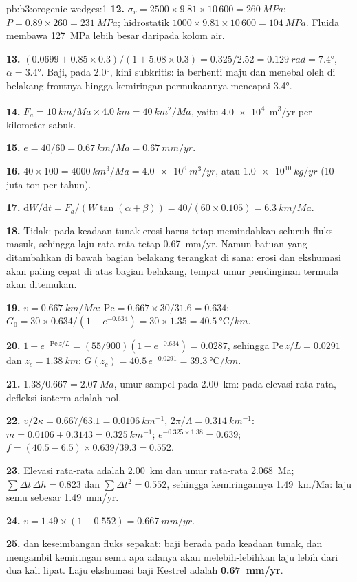 \begin{solution}{pb:b3:orogenic-wedges:1}
\textbf{12.} $\sigma_v = 2500\times9.81\times10\,600 = \qty{260}{MPa}$; $P =
0.89\times260 = \qty{231}{MPa}$; hidrostatik $1000\times9.81\times10\,600 =
\qty{104}{MPa}$. Fluida membawa \qty{127}{MPa} lebih besar daripada
kolom air.

\textbf{13.} $(0.0699 + 0.85\times0.3)/(1 + 5.08\times0.3) = 0.325/2.52 =
\qty{0.129}{rad} = \ang{7.4}$, $\alpha = \ang{3.4}$. Baji, pada \ang{2.0},
kini subkritis: ia berhenti maju dan menebal oleh 
di belakang frontnya hingga kemiringan permukaannya mencapai \ang{3.4}.

\textbf{14.} $F_a = \qty{10}{km/Ma}\times\qty{4.0}{km} = \qty{40}{km^2/Ma}$,
yaitu \qty{4.0e4}{m^3/yr} per kilometer sabuk.

\textbf{15.} $\bar e = 40/60 = \qty{0.67}{km/Ma} = \qty{0.67}{mm/yr}$.

\textbf{16.} $40\times100 = \qty{4000}{km^3/Ma} = \qty{4.0e6}{m^3/yr}$, atau
$\qty{1.0e10}{kg/yr}$ (10 juta ton per tahun).

\textbf{17.} $\mathrm dW/\mathrm dt = F_a/(W\tan(\alpha + \beta)) =
40/(60\times0.105) = \qty{6.3}{km/Ma}$.

\textbf{18.} Tidak: pada keadaan tunak erosi harus tetap memindahkan seluruh
fluks masuk, sehingga laju rata-rata tetap \qty{0.67}{mm/yr}. Namun batuan yang ditambahkan
di bawah bagian belakang terangkat di sana: erosi dan ekshumasi akan paling cepat
di atas bagian belakang, tempat umur pendinginan termuda akan ditemukan.

\textbf{19.} $v = \qty{0.667}{km/Ma}$: $\mathrm{Pe} = 0.667\times30/31.6 =
0.634$; $G_0 = 30\times0.634/(1 - e^{-0.634}) = 30\times1.35 =
\qty{40.5}{\celsius/km}$.

\textbf{20.} $1 - e^{-\mathrm{Pe}\,z/L} = (55/900)(1 - e^{-0.634}) = 0.0287$,
sehingga $\mathrm{Pe}\,z/L = 0.0291$ dan $z_c = \qty{1.38}{km}$; $G(z_c) =
40.5\,e^{-0.0291} = \qty{39.3}{\celsius/km}$.

\textbf{21.} $1.38/0.667 = \qty{2.07}{Ma}$, umur sampel pada
\qty{2.00}{km}: pada elevasi rata-rata, defleksi isoterm adalah nol.

\textbf{22.} $v/2\kappa = 0.667/63.1 = \qty{0.0106}{km^{-1}}$, $2\pi/\Lambda =
\qty{0.314}{km^{-1}}$: $m = 0.0106 + 0.3143 = \qty{0.325}{km^{-1}}$;
$e^{-0.325\times1.38} = 0.639$; $f = (40.5 - 6.5)\times0.639/39.3 = 0.552$.

\textbf{23.} Elevasi rata-rata adalah \qty{2.00}{km} dan umur rata-rata
\qty{2.068}{Ma}; $\sum\Delta t\,\Delta h = 0.823$ dan $\sum\Delta t^2 =
0.552$, sehingga kemiringannya \qty{1.49}{km/Ma}: laju semu sebesar
\qty{1.49}{mm/yr}.

\textbf{24.} $v = 1.49\times(1 - 0.552) = \qty{0.667}{mm/yr}$.

\textbf{25.}  dan keseimbangan fluks sepakat: baji berada
pada keadaan tunak, dan mengambil kemiringan semu apa adanya akan
melebih-lebihkan laju lebih dari dua kali lipat. Laju ekshumasi baji
Kestrel adalah \textbf{\qty[text-series-to-math=true]{0.67}{mm/yr}}.
\end{solution}
